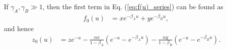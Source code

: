 \documentclass[11pt]{article}
\begin{document}
If $\gamma_A, \gamma_B \gg 1$, then the first term in Eq. (\ref{eq:f(u)_series}) can be found as 
\begin{align}
    f_0(u) &= x e^{-\beta_A u} + y e^{-\beta_B u},
\end{align}
and hence
\begin{align}
    z_0(u) &= z e^{-u} - \frac{\alpha x}{1-\beta_A}\left(e^{-u}-e^{-\beta_A u}\right) - \frac{\alpha y}{1-\beta_B}\left(e^{-u}-e^{-\beta_B u}\right).
\end{align}
\end{document}
